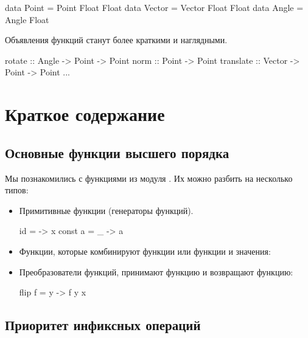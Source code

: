 \begin{code}
data Point  = Point  Float Float
data Vector = Vector Float Float
data Angle  = Angle  Float
\end{code}

Объявления функций станут более краткими и наглядными.

\begin{code}
rotate      :: Angle  -> Point -> Point
norm        :: Point  -> Point
translate   :: Vector -> Point -> Point
...    
\end{code}


\section{Краткое содержание}


\subsection*{Основные функции высшего порядка}

Мы познакомились с функциями из модуля .
Их можно разбить на несколько типов:

\begin{itemize}

\item Примитивные функции (генераторы функций). 
        
\begin{code}
id      = \x -> x
const a = \_ -> a
\end{code}

\item Функции, которые комбинируют функции или функции и значения:
        
        
\item Преобразователи функций, принимают функцию и возвращают функцию:

\begin{code}
flip f = \x y -> f y x
\end{code}

\end{itemize}


\subsection*{Приоритет инфиксных операций}

